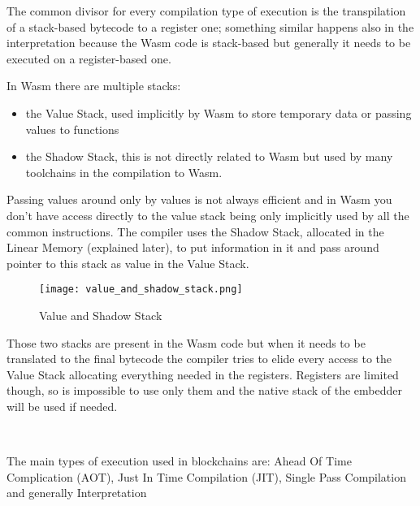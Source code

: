 \documentclass[../main.tex]{subfiles}
\begin{document}
The common divisor for every compilation type of execution is the transpilation of a stack-based bytecode to a register one; something similar happens also in the interpretation because the Wasm code is stack-based but generally it needs to be executed on a register-based one.

In Wasm there are multiple stacks:
\begin{itemize}
  \item the Value Stack, used implicitly by Wasm to store temporary data or passing values to functions
  \item  the Shadow Stack, this is not directly related to Wasm but used by many toolchains in the compilation to Wasm.
\end{itemize}

Passing values around only by values is not always efficient and in Wasm you don't have access directly to the value stack being only implicitly used by all the common instructions. The compiler uses the Shadow Stack, allocated in the Linear Memory (explained later), to put information in it and pass around pointer to this stack as value in the Value Stack.

\begin{figure}[h]
  \centering
  \texttt{[image: value\_and\_shadow\_stack.png]}
  \caption{Value and Shadow Stack}
  \label{fig:value-shadow-stack}
\end{figure}

Those two stacks are present in the Wasm code but when it needs to be translated to the final bytecode the compiler tries to elide every access to the Value Stack allocating everything needed in the registers. Registers are limited though, so is impossible to use only them and the native stack of the embedder will be used if needed.

\

The main types of execution used in blockchains are: Ahead Of Time Complication (AOT), Just In Time Compilation (JIT), Single Pass Compilation and generally Interpretation
\end{document}
